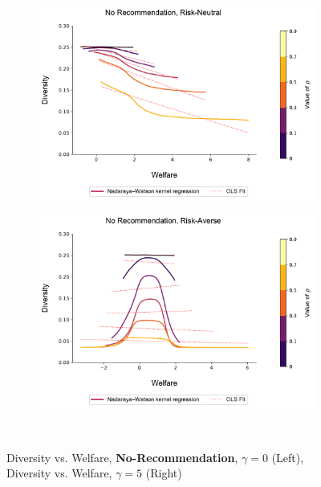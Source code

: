\documentclass[format=acmsmall, review=false]{acmart}
\begin{document}
\begin{figure}[t]
\begin{subfigure}{.45\textwidth}
\includegraphics[width=1.05\linewidth]{figures/diversity_welfare_rn.pdf}
\end{subfigure}
\begin{subfigure}{.45\textwidth}
\includegraphics[width=1.05\linewidth]{figures/diversity_welfare_ra.pdf}
\end{subfigure}\\
\caption{Diversity vs. Welfare, \textbf{No-Recommendation}, $\gamma = 0$ (Left), Diversity vs. Welfare, $\gamma = 5$ (Right)}\label{fig:diversity_welfare_ra}
\end{figure}
\end{document}
